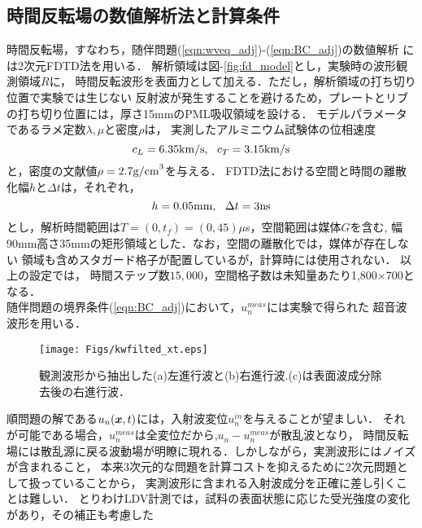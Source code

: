 \subsection{時間反転場の数値解析法と計算条件}
時間反転場，すなわち，随伴問題(\ref{eqn:wveq_adj})-(\ref{eqn:BC_adj})の数値解析
には2次元FDTD法\cite{Fellinger1995, FDTD_KK}を用いる．
解析領域は図-\ref{fig:fd_model}とし，実験時の波形観測領域$R$に，
時間反転波形を表面力として加える．ただし，解析領域の打ち切り位置で実験では生じない
反射波が発生することを避けるため，プレートとリブの打ち切り位置には，厚さ15mmのPML吸収領域を設ける．
モデルパラメータであるラメ定数$\lambda,\mu$と密度$\rho$は，
実測したアルミニウム試験体の位相速度
\begin{equation}
	c_L=6.35{\rm km/s}, \ \ c_T=3.15{\rm km/s}
	\label{eqn:phase_vels}
\end{equation}
と，密度の文献値$\rho=2.7{\rm g/cm}^3$を与える．
FDTD法における空間と時間の離散化幅$h$と$\Delta t$は，それぞれ，
\begin{equation}
	h=0.05{\rm mm}, \ \ \Delta t=3{\rm ns}
	\label{eqn:}
\end{equation}
とし，解析時間範囲は$T=(0,t_f)=(0,45)\mu$s，空間範囲は媒体$G$を含む,
幅90mm高さ35mmの矩形領域とした．なお，空間の離散化では，媒体が存在しない
領域も含めスタガード格子が配置しているが，計算時には使用されない．
以上の設定では，
時間ステップ数$15,000$，空間格子数は未知量あたり1,800$\times$700となる．
%
%
\\
\hspace{\parindent}
随伴問題の境界条件(\ref{eqn:BC_adj})において，$u_n^{meas}$には実験で得られた
超音波波形を用いる．
\begin{figure}[thb]
\centering
	\texttt{[image: Figs/kwfilted\_xt.eps]}
	\caption{観測波形から抽出した(a)左進行波と(b)右進行波.(c)は表面波成分除去後の右進行波．}
	\label{fig:kwfilted_xt}
\end{figure}
順問題の解である$u_n(\boldsymbol{x},t)$には，入射波変位$u_n^{in}$を与えることが望ましい．
それが可能である場合，$u_n^{meas}$は全変位だから,$u_n-u_n^{meas}$が散乱波となり，
時間反転場には散乱源に戻る波動場が明瞭に現れる．しかしながら，実測波形にはノイズが含まれること，
本来3次元的な問題を計算コストを抑えるために2次元問題として扱っていることから，
実測波形に含まれる入射波成分を正確に差し引くことは難しい．
とりわけLDV計測では，試料の表面状態に応じた受光強度の変化があり，その補正も考慮した
